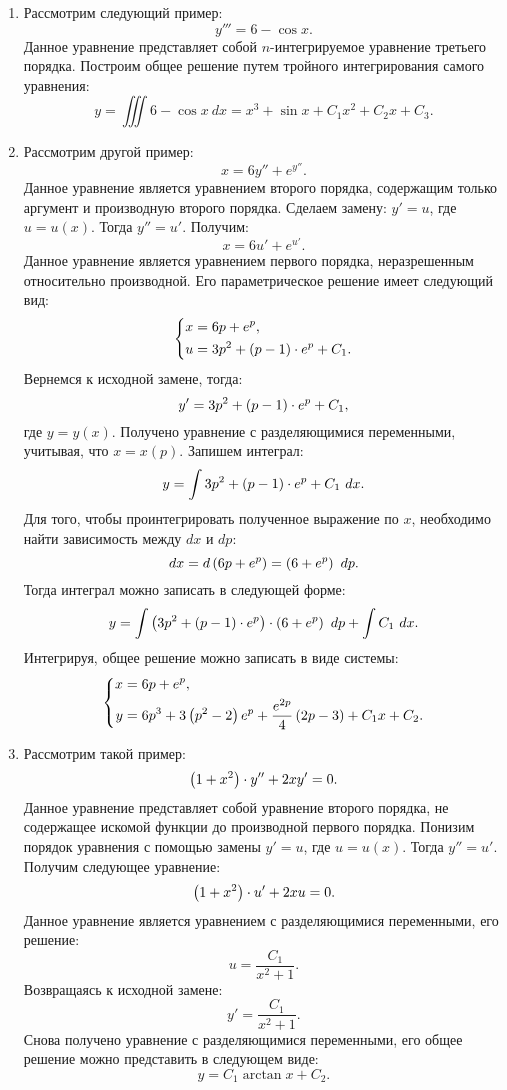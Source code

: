 		\begin{enumerate}

			\item Рассмотрим следующий пример:
				\[ y''' = 6 - \cos{x}. \]
				Данное уравнение представляет собой $n$-интегрируемое уравнение третьего порядка. Построим общее решение путем тройного интегрирования самого уравнения:
				\[ y = \iiint 6 - \cos{x} ~ dx = x^3 + \sin{x} + C_1x^2 + C_2x + C_3. \]

				
			\item Рассмотрим другой пример:
				\[ x = 6y'' + e^{y''}. \]
				Данное уравнение является уравнением второго порядка, содержащим только аргумент и производную второго порядка. Сделаем замену: $y' = u$, где $u = u(x)$. Тогда $y'' = u'$. Получим:
				\[ x = 6u' + e^{u'}. \]
				Данное уравнение является уравнением первого порядка, неразрешенным относительно производной. Его параметрическое решение имеет следующий вид:
				\[ \left\lbrace \begin{split} 
					x &= 6p + e^p, \\
					u &= 3p^2 + \left( p-1 \right) \cdot e^p + C_1.
				\end{split} \right. \]
				Вернемся к исходной замене, тогда:
				\[ y' = 3p^2 + \left( p-1 \right) \cdot e^p + C_1, \]
				где $y = y(x)$. Получено уравнение с разделяющимися переменными, учитывая, что $x = x(p)$. Запишем интеграл:
				\[ y = \int 3p^2 + \left( p-1 \right) \cdot e^p + C_1 ~ dx. \]
				Для того, чтобы проинтегрировать полученное выражение по $x$, необходимо найти зависимость между $dx$ и $dp$:
				\[ dx = d \left( 6p + e^p \right) = \left( 6 + e^{p} \right) ~ dp. \]
				Тогда интеграл можно записать в следующей форме:
				\[ y = \int \left( 3p^2 + \left( p-1 \right) \cdot e^p \right) \cdot \left( 6 + e^p \right) ~ dp + \int C_1 ~ dx. \]
				Интегрируя, общее решение можно записать в виде системы:
				\[ \left\lbrace \begin{split} 
					x &= 6p + e^{p}, \\
					y &= 6p^3 + 3 \left( p^2 - 2 \right) e^{p} + \frac{e^{2p}}{4} \left( 2p - 3 \right) + C_1 x + C_2.
				\end{split} \right. \]

			\item Рассмотрим такой пример:
				\[ \left( 1 + x^2 \right) \cdot y'' + 2xy' = 0. \]
				Данное уравнение представляет собой уравнение второго порядка, не содержащее искомой функции до производной первого порядка. Понизим порядок уравнения с помощью замены $y' = u$, где $u = u(x)$. Тогда $y'' = u'$. Получим следующее уравнение:
				\[ \left( 1 + x^2 \right) \cdot u' + 2xu = 0. \]
				Данное уравнение является уравнением с разделяющимися переменными, его решение:
				\[ u = \frac{C_1}{x^2 + 1}. \]
				Возвращаясь к исходной замене:
				\[ y' = \frac{C_1}{x^2 + 1}. \]
				Снова получено уравнение с разделяющимися переменными, его общее решение можно представить в следующем виде:
				\[ y = C_1 \arctan{x} + C_2. \]


\end{enumerate}
